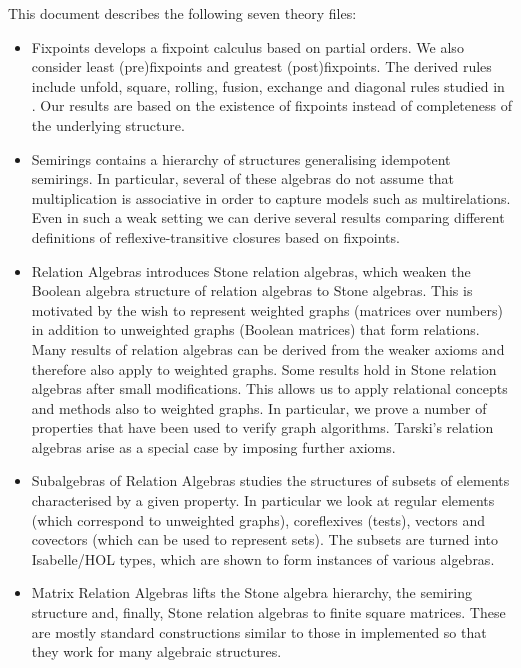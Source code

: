 \documentclass[11pt,a4paper]{article}
\begin{document}
This document describes the following seven theory files:
\begin{itemize}
\item Fixpoints develops a fixpoint calculus based on partial orders.
      We also consider least (pre)fixpoints and greatest (post)fixpoints.
      The derived rules include unfold, square, rolling, fusion, exchange and diagonal rules studied in \cite{AartsBackhouseBoitenDoornbosGasterenGeldropHoogendijkVoermansWoude1995}.
      Our results are based on the existence of fixpoints instead of completeness of the underlying structure.
\item Semirings contains a hierarchy of structures generalising idempotent semirings.
      In particular, several of these algebras do not assume that multiplication is associative in order to capture models such as multirelations.
      Even in such a weak setting we can derive several results comparing different definitions of reflexive-transitive closures based on fixpoints.
\item Relation Algebras introduces Stone relation algebras, which weaken the Boolean algebra structure of relation algebras to Stone algebras.
      This is motivated by the wish to represent weighted graphs (matrices over numbers) in addition to unweighted graphs (Boolean matrices) that form relations.
      Many results of relation algebras can be derived from the weaker axioms and therefore also apply to weighted graphs.
      Some results hold in Stone relation algebras after small modifications.
      This allows us to apply relational concepts and methods also to weighted graphs.
      In particular, we prove a number of properties that have been used to verify graph algorithms.
      Tarski's relation algebras \cite{Tarski1941} arise as a special case by imposing further axioms.
\item Subalgebras of Relation Algebras studies the structures of subsets of elements characterised by a given property.
      In particular we look at regular elements (which correspond to unweighted graphs), coreflexives (tests), vectors and covectors (which can be used to represent sets).
      The subsets are turned into Isabelle/HOL types, which are shown to form instances of various algebras.
\item Matrix Relation Algebras lifts the Stone algebra hierarchy, the semiring structure and, finally, Stone relation algebras to finite square matrices.
      These are mostly standard constructions similar to those in \cite{ArmstrongFosterStruthWeber2016,ArmstrongGomesStruthWeber2016} implemented so that they work for many algebraic structures.

\end{itemize}
\end{document}

